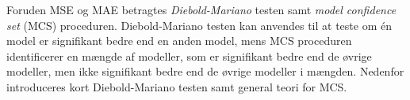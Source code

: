 Foruden MSE og MAE betragtes \textit{Diebold-Mariano} testen samt \textit{model confidence set} (MCS) proceduren.
Diebold-Mariano testen kan anvendes til at teste om én model er signifikant bedre end en anden model, mens MCS proceduren identificerer en mængde af modeller, som er signifikant bedre end de øvrige modeller, men ikke signifikant bedre end de øvrige modeller i mængden.
Nedenfor introduceres kort Diebold-Mariano testen samt general teori for MCS.



